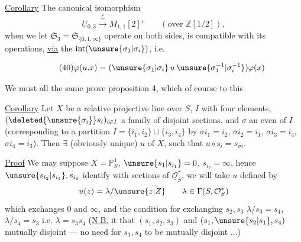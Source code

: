 \uline{Corollary} The canonical isomorphism
\[
U_{0,3}\xrightarrow{\overset{\varphi}{\sim}}M_{1,1}[2]'
\qquad (\text{over }\mathbb Z[1/2]),
\]
when we let $\mathfrak{S}_3=\mathfrak{S}_{\{0,1,\infty\}}$ operate on
both sides, is compatible
with its operations, \uline{via} the  $\operatorname{int}(\unsure{\sigma_1|\sigma_i})$, i.e.


\[
\tag{40}
\varphi(u.x)=(\unsure{\sigma_1|\sigma_i}\,u\,\unsure{\sigma_1^{-1}|\sigma_i^{-1}})\varphi(x)
\]

We must all the same prove proposition 4,
which  of course to this

\uline{Corollary} Let $X$ be a relative projective line
over  $S$, $I$  with four elements,
$(\deleted{\unsure{\sigma_i}}s_i)_{i\in I}$ a family of 
disjoint sections, and $\sigma$ an even  of
$I$ (corresponding to a partition $I=\{i_1,i_2\}\cup\{i_3,i_4\}$
by $\sigma i_1=i_2$, $\sigma i_2=i_1$, $\sigma i_3=i_4$, $\sigma i_4=i_3$). Then $\exists$
 (obviously unique) $u$ of $X$,
such that $u\circ s_i=s_{\sigma i}$.

\uline{Proof} We may suppose $X=\mathbb P^1_S$, $\unsure{s_1|s_{i_1}}=0$, $s_{i_2}=\infty$, hence
$\unsure{s_{i_2}|s_{i_4}},s_{i_3}$ identify with sections of
$\underline{\mathcal O}_S^*$, we will take  $u$ defined by
\[
u(z)=\lambda/\unsure{z|Z}\qquad\lambda\in\Gamma(S,\mathcal O_S^*)
\]
which exchanges $0$ and $\infty$, and the condition
for exchanging $s_2,s_3$  $\lambda/s_3=s_4$, $\lambda/s_4=s_3$
i.e. $\lambda=s_3s_4$ (\uline{N.B.} it  that
$(s_1,s_2,s_3)$ and $(s_1,\unsure{s_2|s_1},s_4)$  mutually disjoint ---
no need for $s_3,s_4$ to be mutually
disjoint $\ldots$)


